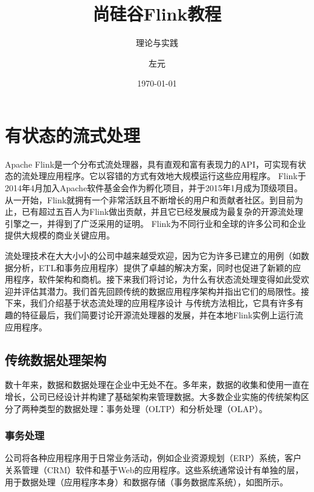 \documentclass[cn,11pt,chinese]{elegantbook}
\title{尚硅谷Flink教程}
\subtitle{理论与实践}
\author{左元}
\institute{尚硅谷大数据组}
\date{\today}
\begin{document}
\maketitle
\frontmatter

\tableofcontents
\mainmatter
\hypertarget{ux6709ux72b6ux6001ux7684ux6d41ux5f0fux5904ux7406}{%
\chapter{有状态的流式处理}\label{ux6709ux72b6ux6001ux7684ux6d41ux5f0fux5904ux7406}}

Apache
Flink是一个分布式流处理器，具有直观和富有表现力的API，可实现有状态的流处理应用程序。它以容错的方式有效地大规模运行这些应用程序。
Flink于2014年4月加入Apache软件基金会作为孵化项目，并于2015年1月成为顶级项目。从一开始，Flink就拥有一个非常活跃且不断增长的用户和贡献者社区。到目前为止，已有超过五百人为Flink做出贡献，并且它已经发展成为最复杂的开源流处理引擎之一，并得到了广泛采用的证明。
Flink为不同行业和全球的许多公司和企业提供大规模的商业关键应用。

流处理技术在大大小小的公司中越来越受欢迎，因为它为许多已建立的用例（如数据分析，ETL和事务应用程序）提供了卓越的解决方案，同时也促进了新颖的应用程序，软件架构和商机。接下来我们将讨论，为什么有状态流处理变得如此受欢迎并评估其潜力。我们首先回顾传统的数据应用程序架构并指出它们的局限性。接下来，我们介绍基于状态流处理的应用程序设计
与传统方法相比，它具有许多有趣的特征最后，我们简要讨论开源流处理器的发展，并在本地Flink实例上运行流应用程序。

\hypertarget{ux4f20ux7edfux6570ux636eux5904ux7406ux67b6ux6784}{%
\section{传统数据处理架构}\label{ux4f20ux7edfux6570ux636eux5904ux7406ux67b6ux6784}}

数十年来，数据和数据处理在企业中无处不在。多年来，数据的收集和使用一直在增长，公司已经设计并构建了基础架构来管理数据。大多数企业实施的传统架构区分了两种类型的数据处理：事务处理（OLTP）和分析处理（OLAP）。

\hypertarget{ux4e8bux52a1ux5904ux7406}{%
\subsection{事务处理}\label{ux4e8bux52a1ux5904ux7406}}

公司将各种应用程序用于日常业务活动，例如企业资源规划（ERP）系统，客户关系管理（CRM）软件和基于Web的应用程序。这些系统通常设计有单独的层，用于数据处理（应用程序本身）和数据存储（事务数据库系统），如图所示。
\end{document}

